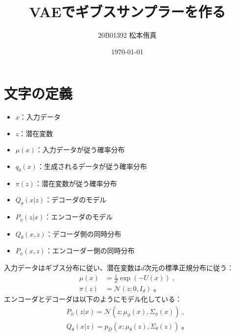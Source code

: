\documentclass[a4paper,11pt,uplatex]{jsarticle}%
\title{VAEでギブスサンプラーを作る}
\author{20B01392 松本侑真}
\date{\today}
\begin{document}
\maketitle
\begin{abstract}

\end{abstract}
\tableofcontents
\newpage

\section{文字の定義}
\begin{itemize}
    \item $x$：入力データ
    \item $z$：潜在変数
    \item $\mu(x)$：入力データが従う確率分布
    \item $q_{\theta}(x)$：生成されるデータが従う確率分布
    \item $\pi(z)$：潜在変数が従う確率分布
    \item $Q_{\theta}(x|z)$：デコーダのモデル
    \item $P_{\phi}(z|x)$：エンコーダのモデル
    \item $Q_{\theta}(x,z)$：デコーダ側の同時分布
    \item $P_{\phi}(x,z)$：エンコーダー側の同時分布
\end{itemize}
入力データはギブス分布に従い、潜在変数は$d$次元の標準正規分布に従う：
\begin{align}
  \mu(x) &= \frac{1}{Z} \exp(-U(x))\;, \\
  \pi(z) &= \mathcal{N}(z;0,I_d)\;。
\end{align}
エンコーダとデコーダは以下のようにモデル化している：
\begin{align}
  P_{\phi}(z|x) = \mathcal{N}(z;\mu_{\phi}(x),\Sigma_{\phi}(x))\;, \\
  Q_{\theta}(x|z) = p_{D}(x;\mu_{\theta}(z),\Sigma_{\theta}(z))\;。
\end{align}
\end{document}
